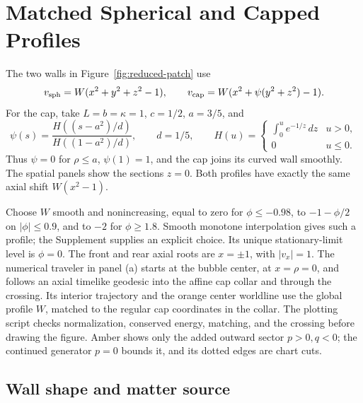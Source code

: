 
\section*{Matched Spherical and Capped Profiles}
\label{app:comparison-profile}

The two walls in Figure~\ref{fig:reduced-patch} use
\begin{equation}
 v_{\rm sph}=W(x^2+y^2+z^2-1),\qquad
 v_{\rm cap}=W(x^2+\psi(y^2+z^2)-1).
 \label{eq:supp-matched-figure-profiles}
\end{equation}
For the cap, take \(L=b=\kappa=1\), \(c=1/2\), \(a=3/5\), and
\[
 \psi(s)=\frac{H((s-a^2)/d)}{H((1-a^2)/d)},\qquad d=1/5,
 \qquad
 H(u)=\begin{cases}\displaystyle\int_0^u e^{-1/z}\,dz&u>0,\\0&u\leq0.
 \end{cases}
\]
Thus \(\psi=0\) for \(\rho\leq a\), \(\psi(1)=1\), and the cap joins
its curved wall smoothly.  The spatial panels show the sections \(z=0\).
Both profiles have exactly the same axial shift \(W(x^2-1)\).

Choose \(W\) smooth and nonincreasing, equal to zero for
\(\phi\leq-0.98\), to \(-1-\phi/2\) on \(|\phi|\leq0.9\), and to
\(-2\) for \(\phi\geq1.8\).  Smooth monotone interpolation gives such a
profile; the Supplement supplies an explicit choice.  Its unique
stationary-limit level is \(\phi=0\).
The front and rear axial roots are \(x=\pm1\), with \(|v_x|=1\).
The numerical traveler in panel (a) starts at the bubble center, at
\(x=\rho=0\), and follows an axial timelike geodesic into the affine cap
collar and through the crossing.  Its interior trajectory and the orange
center worldline use the global profile \(W\), matched to the regular cap
coordinates in the collar.  The plotting script checks normalization,
conserved energy, matching, and the crossing before drawing the figure.
Amber shows only the added outward sector \(p>0,q<0\); the continued
generator \(p=0\) bounds it, and its dotted edges are chart cuts.

\subsection*{Wall shape and matter source}


